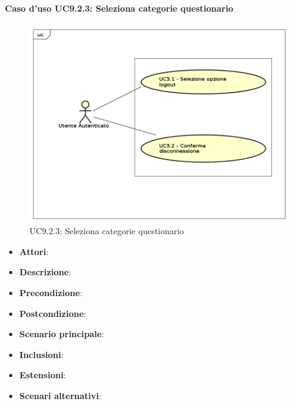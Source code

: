 		\paragraph{Caso d'uso UC9.2.3: Seleziona categorie questionario}
		\label{UC9.2.3}
		\begin{figure}[h]
			\centering
		\includegraphics[scale=0.7,keepaspectratio]{UML/UC9.png}
			\caption{UC9.2.3: Seleziona categorie questionario}
		\end{figure}
		\FloatBarrier
		\begin{itemize}
			\item \textbf{Attori}: 
			\item \textbf{Descrizione}: 
			\item \textbf{Precondizione}: 
			\item \textbf{Postcondizione}: 
			\item \textbf{Scenario principale}:
			\item \textbf{Inclusioni}:
			\item \textbf{Estensioni}:
			\item \textbf{Scenari alternativi}:
		\end{itemize}
		
